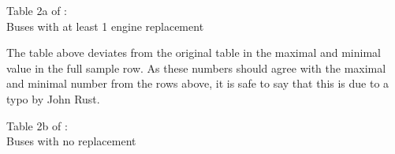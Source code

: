 \documentclass[a4paper,12pt,bold]{scrartcl}
\begin{document}
\newpage

\begin{table}[h]
\begin{center}
  
  \caption{Table 2a of \cite{Rust.1987}: \\ Buses with at least 1 engine replacement}
\end{center}
\end{table}
The table above deviates from the original table in the maximal and minimal value in the full sample row. As these numbers should agree with the maximal and minimal number from the rows above, it is safe to say that this is due to a typo by John Rust. \\
\begin{table}[h]
\begin{center}
  
  \caption{Table 2b of \cite{Rust.1987}: \\ Buses with no replacement}
\end{center}
\end{table}

\newpage
\end{document}
